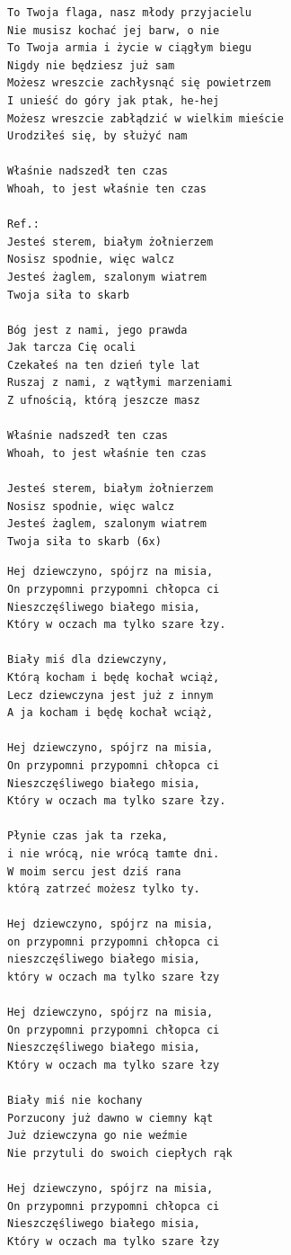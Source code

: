 \documentclass[12pt]{article}
\begin{document}
\begin{verbatim}
To Twoja flaga, nasz młody przyjacielu
Nie musisz kochać jej barw, o nie
To Twoja armia i życie w ciągłym biegu
Nigdy nie będziesz już sam
Możesz wreszcie zachłysnąć się powietrzem
I unieść do góry jak ptak, he-hej
Możesz wreszcie zabłądzić w wielkim mieście
Urodziłeś się, by służyć nam

Właśnie nadszedł ten czas
Whoah, to jest właśnie ten czas

Ref.:
Jesteś sterem, białym żołnierzem
Nosisz spodnie, więc walcz
Jesteś żaglem, szalonym wiatrem
Twoja siła to skarb

Bóg jest z nami, jego prawda
Jak tarcza Cię ocali
Czekałeś na ten dzień tyle lat
Ruszaj z nami, z wątłymi marzeniami
Z ufnością, którą jeszcze masz

Właśnie nadszedł ten czas
Whoah, to jest właśnie ten czas

Jesteś sterem, białym żołnierzem
Nosisz spodnie, więc walcz
Jesteś żaglem, szalonym wiatrem
Twoja siła to skarb (6x)
\end{verbatim}
\clearpage

\begin{verbatim}
Hej dziewczyno, spójrz na misia,
On przypomni przypomni chłopca ci
Nieszczęśliwego białego misia,
Który w oczach ma tylko szare łzy.

Biały miś dla dziewczyny,
Którą kocham i będę kochał wciąż,
Lecz dziewczyna jest już z innym
A ja kocham i będę kochał wciąż,

Hej dziewczyno, spójrz na misia,
On przypomni przypomni chłopca ci
Nieszczęśliwego białego misia,
Który w oczach ma tylko szare łzy.

Płynie czas jak ta rzeka,
i nie wrócą, nie wrócą tamte dni.
W moim sercu jest dziś rana
którą zatrzeć możesz tylko ty.

Hej dziewczyno, spójrz na misia,
on przypomni przypomni chłopca ci
nieszczęśliwego białego misia,
który w oczach ma tylko szare łzy

Hej dziewczyno, spójrz na misia,
On przypomni przypomni chłopca ci
Nieszczęśliwego białego misia,
Który w oczach ma tylko szare łzy

Biały miś nie kochany
Porzucony już dawno w ciemny kąt
Już dziewczyna go nie weźmie
Nie przytuli do swoich ciepłych rąk

Hej dziewczyno, spójrz na misia,
On przypomni przypomni chłopca ci
Nieszczęśliwego białego misia,
Który w oczach ma tylko szare łzy
\end{verbatim}
\clearpage
\end{document}
